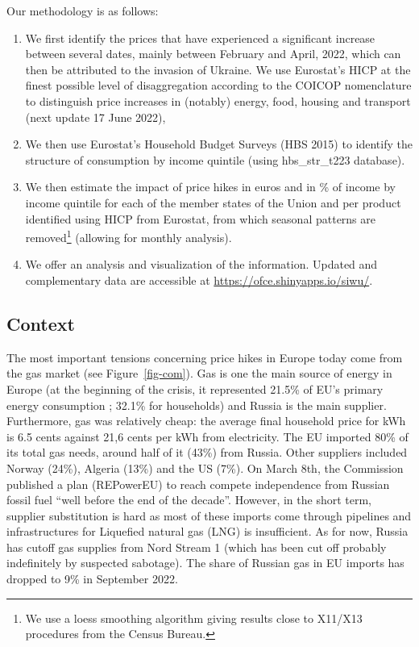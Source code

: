 \documentclass[
  9pt,
  a4paper,
  numbers=noendperiod,
  DIV=12]{scrartcl}
\providecommand{\tightlist}{%
  \setlength{\itemsep}{0pt}\setlength{\parskip}{0pt}}\usepackage{longtable,booktabs,array}
\begin{document}
Our methodology is as follows:

\begin{enumerate}
\def\labelenumi{\arabic{enumi}.}
\tightlist
\item
  We first identify the prices that have experienced a significant
  increase between several dates, mainly between February and April,
  2022, which can then be attributed to the invasion of Ukraine. We use
  Eurostat's HICP at the finest possible level of disaggregation
  according to the COICOP nomenclature to distinguish price increases in
  (notably) energy, food, housing and transport (next update 17 June
  2022),
\item
  We then use Eurostat's Household Budget Surveys (HBS 2015) to identify
  the structure of consumption by income quintile (using hbs\_str\_t223
  database).
\item
  We then estimate the impact of price hikes in euros and in \% of
  income by income quintile for each of the member states of the Union
  and per product identified using HICP from Eurostat, from which
  seasonal patterns are removed\footnote{We use a loess smoothing
    algorithm giving results close to X11/X13 procedures from the Census
    Bureau.} (allowing for monthly analysis).
\item
  We offer an analysis and visualization of the information. Updated and
  complementary data are accessible at
  \url{https://ofce.shinyapps.io/siwu/}.
\end{enumerate}

\hypertarget{context}{%
\subsection{Context}\label{context}}

The most important tensions concerning price hikes in Europe today come
from the gas market (see Figure~\ref{fig-com}). Gas is one the main
source of energy in Europe (at the beginning of the crisis, it
represented 21.5\% of EU's primary energy consumption ; 32.1\% for
households) and Russia is the main supplier. Furthermore, gas was
relatively cheap: the average final household price for kWh is 6.5 cents
against 21,6 cents per kWh from electricity. The EU imported 80\% of its
total gas needs, around half of it (43\%) from Russia. Other suppliers
included Norway (24\%), Algeria (13\%) and the US (7\%). On March 8th,
the Commission published a plan (REPowerEU) to reach compete
independence from Russian fossil fuel ``well before the end of the
decade''. However, in the short term, supplier substitution is hard as
most of these imports come through pipelines and infrastructures for
Liquefied natural gas (LNG) is insufficient. As for now, Russia has
cutoff gas supplies from Nord Stream 1 (which has been cut off probably
indefinitely by suspected sabotage). The share of Russian gas in EU
imports has dropped to 9\% in September 2022.
\end{document}
